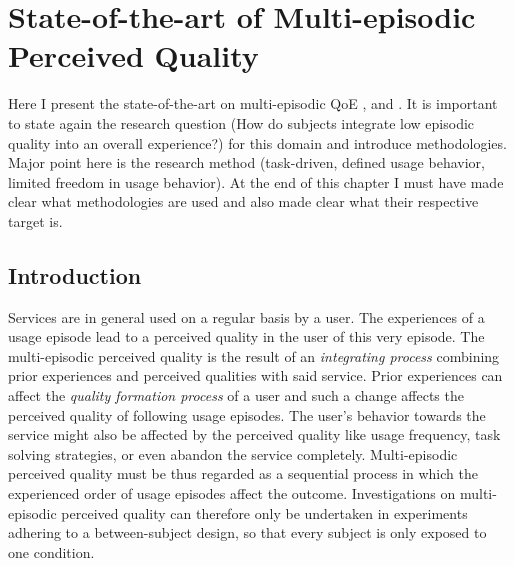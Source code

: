 \chapter{State-of-the-art of Multi-episodic Perceived Quality}\label{chap:state-of-the-art}
\begin{chapter-abstract}
Here I present the state-of-the-art on multi-episodic QoE \cite{duncanson_average_1969}, and \cite{moller_single-call_2011}.
It is important to state again the research question (How do subjects integrate low episodic quality into an overall experience?) for this domain and introduce methodologies.
Major point here is the research method (task-driven, defined usage behavior, limited freedom in usage behavior).
At the end of this chapter I must have made clear what methodologies are used and also made clear what their respective target is.
\end{chapter-abstract}

\section{Introduction}
Services are in general used on a regular basis by a user.
The experiences of a usage episode lead to a perceived quality in the user of this very episode. %
The multi-episodic perceived quality is the result of an \emph{integrating process} combining prior experiences and perceived qualities with said service.
Prior experiences can affect the \emph{quality formation process} of a user and such a change affects the perceived quality of following usage episodes.
The user's behavior towards the service might also be affected by the perceived quality like usage frequency, task solving strategies, or even abandon the service completely.
Multi-episodic perceived quality must be thus regarded as a sequential process in which the experienced order of usage episodes affect the outcome. %
Investigations on multi-episodic perceived quality can therefore only be undertaken in experiments adhering to a between-subject design, so that every subject is only exposed to one condition.

